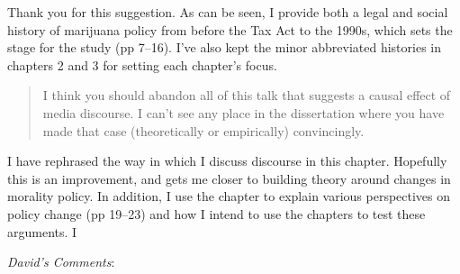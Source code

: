 \documentclass[12pt,stdletter,dateno,sigleft]{newlfm} %
\begin{document}
\begin{newlfm}
Thank you for this suggestion. As can be seen, I provide both a legal and social history of marijuana policy from before the Tax Act to the 1990s, which sets the stage for the study (pp 7--16). I've also kept the minor abbreviated histories in chapters 2 and 3 for setting each chapter's focus. 



\begin{quotation}{\color{red}\noindent \footnotesize
I think you should abandon all of this talk that suggests a causal effect of media discourse.  I can't see any place in the dissertation where you have made that case (theoretically or empirically) convincingly.
}
\end{quotation}


I have rephrased the way in which I discuss discourse in this chapter. Hopefully this is an improvement, and gets me closer to building theory around changes in morality policy. In addition, I use the chapter to explain various perspectives on policy change (pp 19--23) and how I intend to use the chapters to test these arguments. I  \newline 



\textit{David's Comments}:


\end{newlfm}
\end{document}
